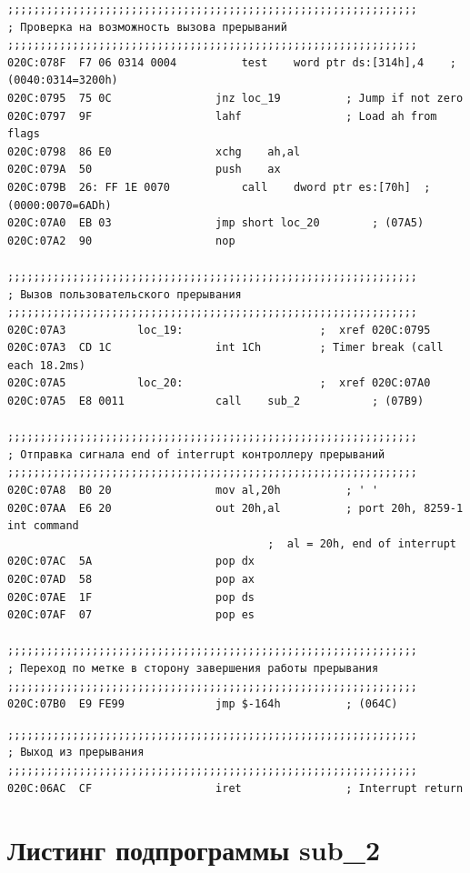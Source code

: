 ﻿\documentclass[a4paper,12pt]{article}
\newcommand{\anonsection}[1]{\section*{#1}\addcontentsline{toc}{section}{#1}}
\begin{document}
\begin{lstlisting}
;;;;;;;;;;;;;;;;;;;;;;;;;;;;;;;;;;;;;;;;;;;;;;;;;;;;;;;;;;;;;;;
; Проверка на возможность вызова прерываний
;;;;;;;;;;;;;;;;;;;;;;;;;;;;;;;;;;;;;;;;;;;;;;;;;;;;;;;;;;;;;;;
020C:078F  F7 06 0314 0004			test	word ptr ds:[314h],4	; (0040:0314=3200h)
020C:0795  75 0C				jnz	loc_19			; Jump if not zero
020C:0797  9F					lahf				; Load ah from flags
020C:0798  86 E0				xchg	ah,al
020C:079A  50					push	ax
020C:079B  26: FF 1E 0070			call	dword ptr es:[70h]	; (0000:0070=6ADh)
020C:07A0  EB 03				jmp	short loc_20		; (07A5)
020C:07A2  90					nop

;;;;;;;;;;;;;;;;;;;;;;;;;;;;;;;;;;;;;;;;;;;;;;;;;;;;;;;;;;;;;;;
; Вызов пользовательского прерывания
;;;;;;;;;;;;;;;;;;;;;;;;;;;;;;;;;;;;;;;;;;;;;;;;;;;;;;;;;;;;;;;
020C:07A3			loc_19:						;  xref 020C:0795
020C:07A3  CD 1C				int	1Ch			; Timer break (call each 18.2ms)
020C:07A5			loc_20:						;  xref 020C:07A0
020C:07A5  E8 0011				call	sub_2			; (07B9)

;;;;;;;;;;;;;;;;;;;;;;;;;;;;;;;;;;;;;;;;;;;;;;;;;;;;;;;;;;;;;;;
; Отправка сигнала end of interrupt контроллеру прерываний
;;;;;;;;;;;;;;;;;;;;;;;;;;;;;;;;;;;;;;;;;;;;;;;;;;;;;;;;;;;;;;;
020C:07A8  B0 20				mov	al,20h			; ' '
020C:07AA  E6 20				out	20h,al			; port 20h, 8259-1 int command
										;  al = 20h, end of interrupt
020C:07AC  5A					pop	dx
020C:07AD  58					pop	ax
020C:07AE  1F					pop	ds
020C:07AF  07					pop	es

;;;;;;;;;;;;;;;;;;;;;;;;;;;;;;;;;;;;;;;;;;;;;;;;;;;;;;;;;;;;;;;
; Переход по метке в сторону завершения работы прерывания
;;;;;;;;;;;;;;;;;;;;;;;;;;;;;;;;;;;;;;;;;;;;;;;;;;;;;;;;;;;;;;;
020C:07B0  E9 FE99				jmp	$-164h			; (064C)
    \end{lstlisting}

    \begin{lstlisting}
;;;;;;;;;;;;;;;;;;;;;;;;;;;;;;;;;;;;;;;;;;;;;;;;;;;;;;;;;;;;;;;
; Выход из прерывания
;;;;;;;;;;;;;;;;;;;;;;;;;;;;;;;;;;;;;;;;;;;;;;;;;;;;;;;;;;;;;;;
020C:06AC  CF					iret				; Interrupt return
    \end{lstlisting}

    \newpage

    \anonsection{Листинг подпрограммы sub\_2}
\end{document}

